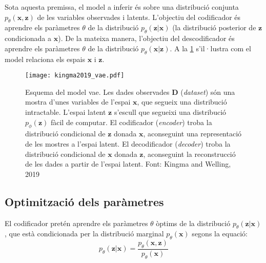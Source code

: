 \documentclass[CAT,BIB]{TFUOC}%
\begin{document}
        Sota aquesta premissa,
        el model a inferir és sobre una distribució conjunta $p_\theta(\mathbf{x,z})$
        de les variables observades i latents.
        L'objectiu del codificador és aprendre els paràmetres $\theta$
        de la distribució $p_\theta(\mathbf{z|x})$
        (la distribució posterior de $\mathbf{z}$ condicionada a $\mathbf{x}$).
        De la mateixa manera,
        l'objectiu del descodificador és aprendre els paràmetres $\theta$
        de la distribució $p_\theta(\mathbf{x|z})$.
        A la \cref{fig:vae_kingma} s'il·lustra
        com el model relaciona els espais $\mathbf{x}$ i $\mathbf{z}$.

        \begin{figure}
            \centering
            \texttt{[image: kingma2019\_vae.pdf]}
            \caption[\textit{Variational autoencoder}: model probabilístic]{
                Esquema del model \gls{vae}.
                Les dades observades $\mathbf{D}$ (\textit{dataset})
                són una mostra d'unes variables de l'espai $\mathbf{x}$,
                que segueix una distribució intractable.
                L'espai latent $\mathbf{z}$ s'escull que segueixi
                una distribució $p_\phi(\mathbf{z})$ fàcil de computar.
                El codificador (\textit{encoder})
                troba la distribució condicional de $\mathbf{z}$ donada $\mathbf{x}$,
                aconseguint una representació de les mostres a l'espai latent.
                El decodificador (\textit{decoder})
                troba la distribució condicional de $\mathbf{x}$ donada $\mathbf{z}$,
                aconseguint la reconstrucció de les dades a partir de l'espai latent.
                Font: Kingma and Welling, 2019 \citep{Kingma2019}
            }
            \label{fig:vae_kingma}
        \end{figure}

    \subsection{Optimització dels paràmetres}
    \label{s:vae_optimitzacio}

        El codificador pretén aprendre els paràmetres $\theta$ òptims
        de la distribució $p_\theta(\mathbf{z|x})$,
        que està condicionada per la distribució marginal $p_\theta(\mathbf{x})$
        segons la equació:
        \begin{equation}
        \label{eq:cond_p_z_on_x}
            p_\theta(\mathbf{z|x}) =
            \frac {p_\theta(\mathbf{x,z})}
                  {p_\theta(\mathbf{x})}
        \end{equation}
\end{document}
